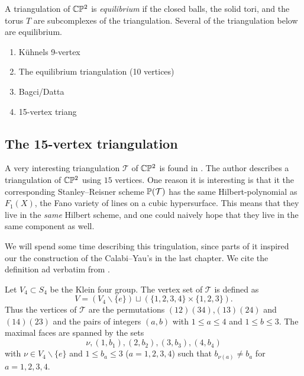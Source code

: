 A triangulation of $\C \P^2$ is \emph{equilibrium} if the closed balls, the solid tori, and the torus $T$ are subcomplexes of the triangulation. Several of the triangulation below are equilibrium.

\begin{enumerate}
	\item Kühnels 9-vertex
	\item The equilibrium triangulation (10 vertices)
	\item Bagci/Datta
	\item 15-vertex triang
\end{enumerate}

\subsection{The 15-vertex triangulation}

A very interesting triangulation $\mathcal T$ of $\C\P^2$ is found in \cite{cp2_15_chess}. The author describes a triangulation of $\C \P^2$ using $15$ vertices. One reason it is interesting is that it the corresponding Stanley--Reisner scheme $\P(\mathcal T)$ has the same Hilbert-polynomial as $F_1(X)$, the Fano variety of lines on a cubic hypersurface. This means that they live in the \emph{same} Hilbert scheme, and one could naively hope that they live in the same component as well.

 We will spend some time describing this tringulation, since parts of it inspired our the construction of the Calabi--Yau's in the last chapter. We cite the definition ad verbatim from \cite{cp2_15_chess}. 

 \begin{definition}
 Let $V_4 \subset S_4$ be the Klein four group. The vertex set of $\mathcal T$ is defined as
 \begin{equation}
 V = (V_4 \backslash \{e \}) \sqcup \left( \{1,2,3,4 \} \times \{ 1,2,3 \} \right).
 \end{equation}
 Thus the vertices of $\mathcal T$ are the permutations $(12)(34)$,$(13)(24)$ and $(14)(23)$ and the pairs of integers $(a,b)$ with $1 \leq a \leq 4$ and $1 \leq b \leq 3$. The maximal faces are spanned by the sets 
 \begin{equation}
 \nu, (1,b_1), (2,b_2), (3,b_3), (4,b_4)
 \end{equation}
 with $\nu \in V_4 \backslash \{ e \}$ and $1 \leq b_a \leq 3$ ($a=1,2,3,4$) such that $b_{\nu(a)} \neq b_a$ for $a=1,2,3,4$.
 \end{definition}

